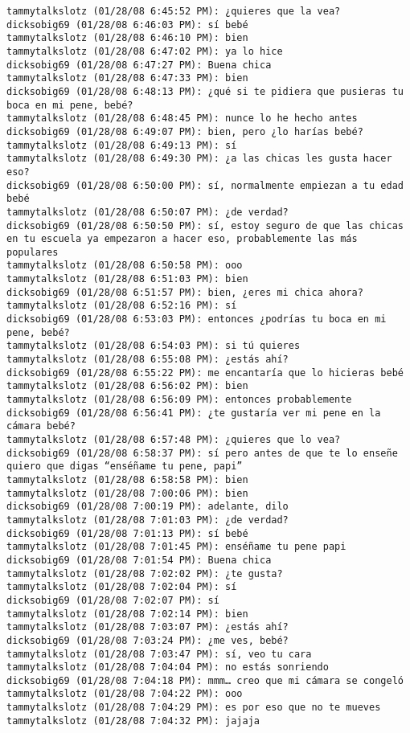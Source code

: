 \begin{verbatim}
tammytalkslotz (01/28/08 6:45:52 PM): ¿quieres que la vea?
dicksobig69 (01/28/08 6:46:03 PM): sí bebé
tammytalkslotz (01/28/08 6:46:10 PM): bien
tammytalkslotz (01/28/08 6:47:02 PM): ya lo hice
dicksobig69 (01/28/08 6:47:27 PM): Buena chica
tammytalkslotz (01/28/08 6:47:33 PM): bien
dicksobig69 (01/28/08 6:48:13 PM): ¿qué si te pidiera que pusieras tu boca en mi pene, bebé?
tammytalkslotz (01/28/08 6:48:45 PM): nunce lo he hecho antes
dicksobig69 (01/28/08 6:49:07 PM): bien, pero ¿lo harías bebé?
tammytalkslotz (01/28/08 6:49:13 PM): sí
tammytalkslotz (01/28/08 6:49:30 PM): ¿a las chicas les gusta hacer eso?
dicksobig69 (01/28/08 6:50:00 PM): sí, normalmente empiezan a tu edad bebé
tammytalkslotz (01/28/08 6:50:07 PM): ¿de verdad?
dicksobig69 (01/28/08 6:50:50 PM): sí, estoy seguro de que las chicas en tu escuela ya empezaron a hacer eso, probablemente las más populares
tammytalkslotz (01/28/08 6:50:58 PM): ooo
tammytalkslotz (01/28/08 6:51:03 PM): bien
dicksobig69 (01/28/08 6:51:57 PM): bien, ¿eres mi chica ahora?
tammytalkslotz (01/28/08 6:52:16 PM): sí
dicksobig69 (01/28/08 6:53:03 PM): entonces ¿podrías tu boca en mi pene, bebé?
tammytalkslotz (01/28/08 6:54:03 PM): si tú quieres
tammytalkslotz (01/28/08 6:55:08 PM): ¿estás ahí?
dicksobig69 (01/28/08 6:55:22 PM): me encantaría que lo hicieras bebé
tammytalkslotz (01/28/08 6:56:02 PM): bien
tammytalkslotz (01/28/08 6:56:09 PM): entonces probablemente
dicksobig69 (01/28/08 6:56:41 PM): ¿te gustaría ver mi pene en la cámara bebé?
tammytalkslotz (01/28/08 6:57:48 PM): ¿quieres que lo vea?
dicksobig69 (01/28/08 6:58:37 PM): sí pero antes de que te lo enseñe quiero que digas “enséñame tu pene, papi”
tammytalkslotz (01/28/08 6:58:58 PM): bien
tammytalkslotz (01/28/08 7:00:06 PM): bien
dicksobig69 (01/28/08 7:00:19 PM): adelante, dilo
tammytalkslotz (01/28/08 7:01:03 PM): ¿de verdad?
dicksobig69 (01/28/08 7:01:13 PM): sí bebé
tammytalkslotz (01/28/08 7:01:45 PM): enséñame tu pene papi
dicksobig69 (01/28/08 7:01:54 PM): Buena chica
tammytalkslotz (01/28/08 7:02:02 PM): ¿te gusta?
tammytalkslotz (01/28/08 7:02:04 PM): sí
dicksobig69 (01/28/08 7:02:07 PM): sí
tammytalkslotz (01/28/08 7:02:14 PM): bien
tammytalkslotz (01/28/08 7:03:07 PM): ¿estás ahí?
dicksobig69 (01/28/08 7:03:24 PM): ¿me ves, bebé?
tammytalkslotz (01/28/08 7:03:47 PM): sí, veo tu cara
tammytalkslotz (01/28/08 7:04:04 PM): no estás sonriendo
dicksobig69 (01/28/08 7:04:18 PM): mmm… creo que mi cámara se congeló
tammytalkslotz (01/28/08 7:04:22 PM): ooo
tammytalkslotz (01/28/08 7:04:29 PM): es por eso que no te mueves
tammytalkslotz (01/28/08 7:04:32 PM): jajaja

\end{verbatim}
